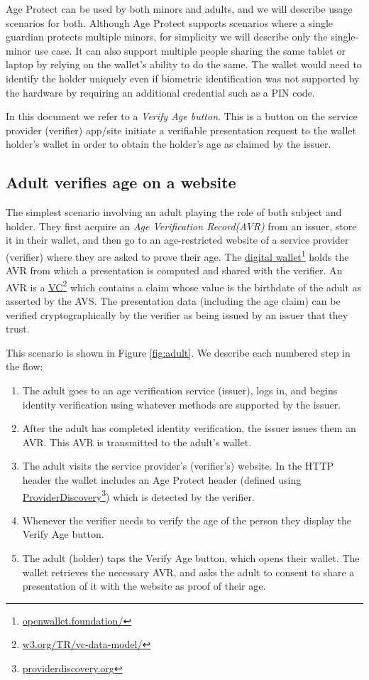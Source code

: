 \documentclass[11pt, oneside]{article}   	%
\newcommand{\hyperfootnote}[1][]{\def\ArgI{{#1}}\hyperfootnoteRelay}
\newcommand\hyperfootnoteRelay[2][]{\href{#1#2}{\ArgI}\footnote{\href{#1#2}{#2}}}
\begin{document}
Age Protect can be used by both minors and adults, and we will describe usage scenarios for both. Although Age Protect supports scenarios where a single guardian protects multiple minors, for simplicity we will describe only the single-minor use case. It can also support multiple people sharing the same tablet or laptop by relying on the wallet's ability to do the same. The wallet would need to identify the holder uniquely even if biometric identification was not supported by the hardware by requiring an additional credential such as a PIN code.

In this document we refer to a \emph{Verify Age button}. This is a button on the service provider (verifier) app/site initiate a verifiable presentation request to the wallet holder's wallet in order to obtain the holder's age as claimed by the issuer.

\subsection{Adult verifies age on a website}

The simplest scenario involving an adult playing the role of both subject and holder. They first acquire an \emph{Age Verification Record(AVR)} from an issuer, store it in their wallet, and then go to an age-restricted website of a service provider (verifier) where they are asked to prove their age. The \hyperfootnote[digital wallet][https://]{openwallet.foundation/} holds the AVR from which a presentation is computed and shared with the verifier. An AVR is a \hyperfootnote[VC][https://]{w3.org/TR/vc-data-model/} which contains a claim whose value is the birthdate of the adult as asserted by the AVS. The presentation data (including the age claim) can be verified cryptographically by the verifier as being issued by an issuer that they trust.

This scenario is shown in Figure \ref{fig:adult}. We describe each numbered step in the flow: 

\begin{enumerate}
	\item The adult goes to an age verification service (issuer), logs in, and begins identity verification using whatever methods are supported by the issuer. 
	\item After the adult has completed identity verification, the issuer issues them an AVR. This AVR is transmitted to the adult's wallet.
	\item The adult visits the service provider's (verifier's) website. In the HTTP header the wallet includes an Age Protect header (defined using \hyperfootnote[ProviderDiscovery][https://]{providerdiscovery.org}) which is detected by the verifier. 
	\item Whenever the verifier needs to verify the age of the person they display the Verify Age button.
	\item The adult (holder) taps the Verify Age button, which opens their wallet. The wallet retrieves the necessary AVR, and asks the adult to consent to share a presentation of it with the website as proof of their age. 
\end{enumerate}
\end{document}
